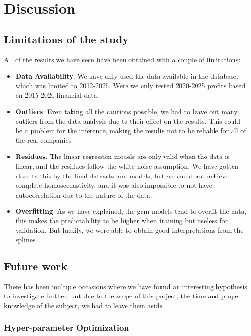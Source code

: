 \documentclass[11pt,english,a4paper,hidelinks]{book}
\begin{document}
\section{Discussion}

\subsection{Limitations of the study}
\noindent All of the results we have seen have been obtained with a couple of limitations:
\begin{itemize}
    \item \textbf{Data Availability}. We have only used the data available in the database, which was limited to 2012-2025. Were we only tested 2020-2025 profits based on 2015-2020 financial data.
    \item \textbf{Outliers}. Even taking all the cautions possible, we had to leave out many outliers from the data analysis due to their effect on the results. This could be a problem for the inference, making the results not to be reliable for all of the real companies.
    \item \textbf{Residues}. The linear regression models are only valid when the data is linear, and the residues follow the white noise assumption. We have gotten close to this by the final datasets and models, but we could not achieve complete homoscedasticity, and it was also impossible to not have autocorrelation due to the nature of the data. 
    \item \textbf{Overfitting}. As we have explained, the \acrshort{gam} models tend to overfit the data, this makes the predictability to be higher when training but useless for validation. But luckily, we were able to obtain good interpretations from the splines.
\end{itemize}

\subsection{Future work}

\noindent There has been multiple occasions where we have found an interesting hypothesis to investigate further, but due to the scope of this project, the time and proper knowledge of the subject, we had to leave them aside.

\subsubsection{Hyper-parameter Optimization}
\end{document}
